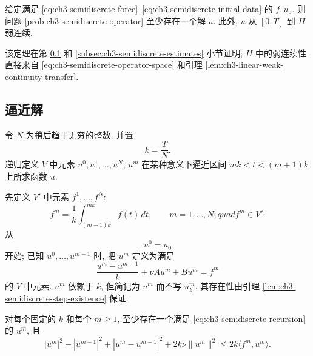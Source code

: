 \begin{Theorem}
\label{thm:ch3-semidiscrete-existence}
给定满足 \eqref{eq:ch3-semidiscrete-force}--\eqref{eq:ch3-semidiscrete-initial-data} 的 $f,u_0$. 则问题 \ref{prob:ch3-semidiscrete-operator} 至少存在一个解 $u$. 此外, $u$ 从 $[0,T]$ 到 $H$ 弱连续.
\end{Theorem}

该定理在第 \ref{subsec:ch3-semidiscrete-approximation} 和 \ref{subsec:ch3-semidiscrete-estimates} 小节证明; $H$ 中的弱连续性直接来自 \eqref{eq:ch3-semidiscrete-operator-space} 和引理 \ref{lem:ch3-linear-weak-continuity-transfer}.

\hypertarget{chapter-03-page-234}{}
\subsection{逼近解}
\label{subsec:ch3-semidiscrete-approximation}
令 $N$ 为稍后趋于无穷的整数, 并置
\begin{equation}
k=\frac TN.
\label{eq:ch3-semidiscrete-time-step}
\end{equation}
递归定义 $V$ 中元素 $u^0,u^1,\ldots,u^N$; $u^m$ 在某种意义下逼近区间 $mk<t<(m+1)k$ 上所求函数 $u$.

先定义 $V'$ 中元素 $f^1,\ldots,f^N$:
\begin{equation}
f^m=\frac1k\int_{(m-1)k}^{mk}f(t)\,dt,
\qquad m=1,\ldots,N;quad f^m\in V'.
\label{eq:ch3-semidiscrete-force-average}
\end{equation}
从
\begin{equation}
u^0=u_0
\label{eq:ch3-semidiscrete-u0}
\end{equation}
开始; 已知 $u^0,\ldots,u^{m-1}$ 时, 把 $u^m$ 定义为满足
\begin{equation}
\frac{u^m-u^{m-1}}k+\nu Au^m+Bu^m=f^m
\label{eq:ch3-semidiscrete-recursion}
\end{equation}
的 $V$ 中元素. $u^m$ 依赖于 $k$, 但简记为 $u^m$ 而不写 $u_k^m$. 其存在性由引理 \ref{lem:ch3-semidiscrete-step-existence} 保证.

\begin{Lemma}
\label{lem:ch3-semidiscrete-step-existence}
对每个固定的 $k$ 和每个 $m\geq1$, 至少存在一个满足 \eqref{eq:ch3-semidiscrete-recursion} 的 $u^m$, 且
\begin{equation}
|u^m|^2-|u^{m-1}|^2+|u^m-u^{m-1}|^2
+2k\nu\lVert u^m\rVert^2\leq2k\langle f^m,u^m\rangle.
\label{eq:ch3-semidiscrete-step-energy}
\end{equation}
\end{Lemma}

